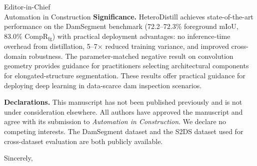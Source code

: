 \documentclass[11pt]{letter}
\begin{document}
\begin{letter}{Editor-in-Chief \\ Automation in Construction}
\medskip
\textbf{Significance.}
HeteroDistill achieves state-of-the-art performance on the DamSegment benchmark (72.2--72.3\% foreground mIoU, 83.0\% CompR$_{\text{fg}}$) with practical deployment advantages: no inference-time overhead from distillation, 5--7$\times$ reduced training variance, and improved cross-domain robustness. The parameter-matched negative result on convolution geometry provides guidance for practitioners selecting architectural components for elongated-structure segmentation. These results offer practical guidance for deploying deep learning in data-scarce dam inspection scenarios.

\medskip
\textbf{Declarations.}
This manuscript has not been published previously and is not under consideration elsewhere. All authors have approved the manuscript and agree with its submission to \textit{Automation in Construction}. We declare no competing interests. The DamSegment dataset and the S2DS dataset used for cross-dataset evaluation are both publicly available.

\closing{Sincerely,}

\end{letter}
\end{document}
